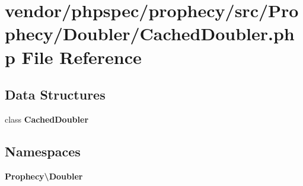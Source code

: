 \section{vendor/phpspec/prophecy/src/\+Prophecy/\+Doubler/\+Cached\+Doubler.php File Reference}
\label{_cached_doubler_8php}
\subsection*{Data Structures}
\begin{DoxyCompactItemize}
\item 
class {\bf Cached\+Doubler}
\end{DoxyCompactItemize}
\subsection*{Namespaces}
\begin{DoxyCompactItemize}
\item 
 {\bf Prophecy\textbackslash{}\+Doubler}
\end{DoxyCompactItemize}

